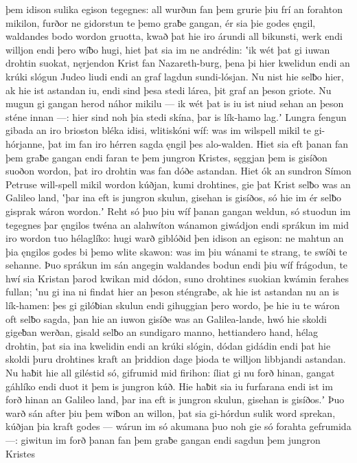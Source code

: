 þem idison sulika egison tegegnes: all wurðun fan þem grurie
þiu frí an forahton mikilon, furðor ne gidorstun
te þemo graƀe gangan, ér sia þie godes ęngil,
waldandes bodo wordon gruotta,
kwað þat hie iro árundi all bikunsti,
werk endi willjon endi þero wíƀo hugi,
hiet þat sia im ne andrédin: ʽik wét þat gi iuwan drohtin suokat,
nęrjendon Krist fan Nazareth-burg,
þena þi hier kwelidun endi an krúki slógun
Judeo liudi endi an graf lagdun
sundi-lósjan. Nu nist hie selƀo hier,
ak hie ist astandan iu, endi sind þesa stedi lárea,
þit graf an þeson griote. Nu mugun gi gangan herod
náhor mikilu — ik wét þat is iu ist niud sehan
an þeson sténe innan —: hier sind noh þia stedi skína,
þar is lík-hamo lag.ʼ Lungra fengun
gibada an iro brioston bléka idisi,
wlitiskóni wíf: was im wilspell mikil
te gi-hórjanne, þat im fan iro hérren sagda
ęngil þes alo-walden. Hiet sia eft þanan
fan þem graƀe gangan endi faran te þem jungron Kristes,
sęggjan þem is gisíðon suoðon wordon,
þat iro drohtin was fan dóðe astandan.
Hiet ók an sundron Símon Petruse
will-spell mikil wordon kúðjan,
kumi drohtines, gie þat Krist selƀo
was an Galileo land, ʽþar ina eft is jungron skulun,
gisehan is gisíðos, só hie im ér selƀo gisprak
wáron wordon.ʼ Reht só þuo þiu wíf þanan
gangan weldun, só stuodun im tegegnes þar
ęngilos twéna an alahwíton
wánamon giwádjon endi sprákun im mid iro wordon tuo
hélaglíko: hugi warð giblóðid
þen idison an egison: ne mahtun an þia ęngilos godes
bi þemo wlite skawon: was im þiu wánami te strang,
te swíði te sehanne. Þuo sprákun im sán angegin
waldandes bodun endi þiu wíf frágodun,
te hwí sia Kristan þarod kwikan mid dódon,
suno drohtines suokian kwámin
ferahes fullan; ʽnu gi ina ni findat hier
an þeson sténgraƀe, ak hie ist astandan nu
an is lík-hamen: þes gi gilóƀian skulun
endi gihuggian þero wordo, þe hie iu te wáron oft
selƀo sagda, þan hie an iuwon gisíðe was
an Galilea-lande, hwó hie skoldi gigeƀan werðan,
gisald selƀo an sundigaro manno,
hettiandero hand, hélag drohtin,
þat sia ina kwelidin endi an krúki slógin,
dódan gidádin endi þat hie skoldi þuru drohtines kraft
an þriddion dage þioda te willjon
libbjandi astandan. Nu haƀit hie all giléstid só,
gifrumid mid firihon: íliat gi nu forð hinan,
gangat gáhlíko endi duot it þem is jungron kúð.
Hie haƀit sia iu furfarana endi ist im forð hinan
an Galileo land, þar ina eft is jungron skulun,
gisehan is gisíðos.ʼ Þuo warð sán after þiu
þem wiƀon an willon, þat sia gi-hórdun sulik word sprekan,
kúðjan þia kraft godes — wárun im só akumana þuo noh
gie só forahta gefrumida —: giwitun im forð þanan
fan þem graƀe gangan endi sagdun þem jungron Kristes
